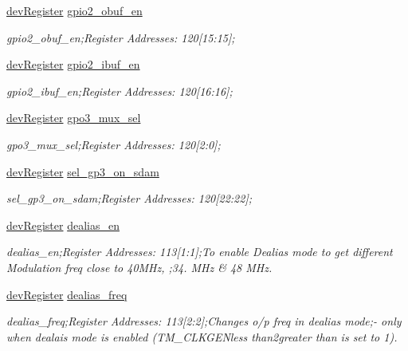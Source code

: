 \begin{DoxyCompactItemize}
\mbox{\hyperlink{classdev_register}{dev\+Register}} \mbox{\hyperlink{class_o_p_t3101_registers_ad472858db7f60d4f24f341366ca60662}{gpio2\+\_\+obuf\+\_\+en}}
\begin{DoxyCompactList}\small\item\em gpio2\+\_\+obuf\+\_\+en;Register Addresses\+: 120\mbox{[}15\+:15\mbox{]}; \end{DoxyCompactList}\item 
\mbox{\hyperlink{classdev_register}{dev\+Register}} \mbox{\hyperlink{class_o_p_t3101_registers_a7825ff77b413c03b2b692cbaa14f1776}{gpio2\+\_\+ibuf\+\_\+en}}
\begin{DoxyCompactList}\small\item\em gpio2\+\_\+ibuf\+\_\+en;Register Addresses\+: 120\mbox{[}16\+:16\mbox{]}; \end{DoxyCompactList}\item 
\mbox{\hyperlink{classdev_register}{dev\+Register}} \mbox{\hyperlink{class_o_p_t3101_registers_a40cba8f8dd248a5f91d94e0125123cd0}{gpo3\+\_\+mux\+\_\+sel}}
\begin{DoxyCompactList}\small\item\em gpo3\+\_\+mux\+\_\+sel;Register Addresses\+: 120\mbox{[}2\+:0\mbox{]}; \end{DoxyCompactList}\item 
\mbox{\hyperlink{classdev_register}{dev\+Register}} \mbox{\hyperlink{class_o_p_t3101_registers_a8598e21fd562e98f5225f398a3440a5a}{sel\+\_\+gp3\+\_\+on\+\_\+sdam}}
\begin{DoxyCompactList}\small\item\em sel\+\_\+gp3\+\_\+on\+\_\+sdam;Register Addresses\+: 120\mbox{[}22\+:22\mbox{]}; \end{DoxyCompactList}\item 
\mbox{\hyperlink{classdev_register}{dev\+Register}} \mbox{\hyperlink{class_o_p_t3101_registers_ac931eedf109f2f9401b66df4e3507a4b}{dealias\+\_\+en}}
\begin{DoxyCompactList}\small\item\em dealias\+\_\+en;Register Addresses\+: 113\mbox{[}1\+:1\mbox{]};To enable Dealias mode to get different Modulation freq close to 40\+M\+Hz, ;34. M\+Hz \& 48 M\+Hz. \end{DoxyCompactList}\item 
\mbox{\hyperlink{classdev_register}{dev\+Register}} \mbox{\hyperlink{class_o_p_t3101_registers_a06fbd3557236e1c0b91d69f2a9d426aa}{dealias\+\_\+freq}}
\begin{DoxyCompactList}\small\item\em dealias\+\_\+freq;Register Addresses\+: 113\mbox{[}2\+:2\mbox{]};Changes o/p freq in dealias mode;-\/ only when dealais mode is enabled (T\+M\+\_\+\+C\+L\+K\+G\+E\+Nless than2greater than is set to \textquotesingle{}1\textquotesingle{}). \end{DoxyCompactList}\item 

\end{DoxyCompactItemize}
